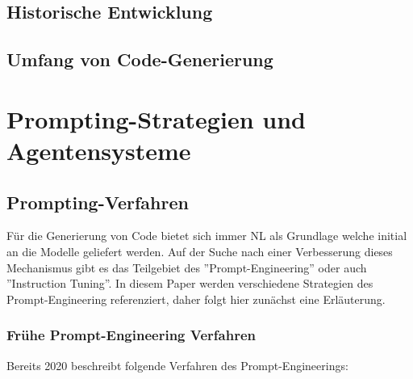 \subsection{Historische Entwicklung}\label{ch:Historische Entwicklung}


\subsection{Umfang von Code-Generierung}\label{ch:Umfang von Code-Generierung}




\section{Prompting-Strategien und Agentensysteme}\label{ch:Prompting-Strategien und Agentensysteme}



\subsection{Prompting-Verfahren}

Für die Generierung von Code bietet sich immer NL als Grundlage welche initial an die Modelle geliefert werden. Auf der Suche nach einer Verbesserung dieses Mechanismus gibt es das Teilgebiet des ''Prompt-Engineering'' oder auch ''Instruction Tuning''\cite{jiangSurveyLargeLanguage2026}.  In diesem Paper werden verschiedene Strategien des Prompt-Engineering referenziert, daher folgt hier zunächst eine Erläuterung.

\subsubsection{Frühe Prompt-Engineering Verfahren}\label{ch:prompting:early}

Bereits 2020 beschreibt \cite{brownLanguageModelsAre2020} folgende Verfahren des Prompt-Engineerings:

